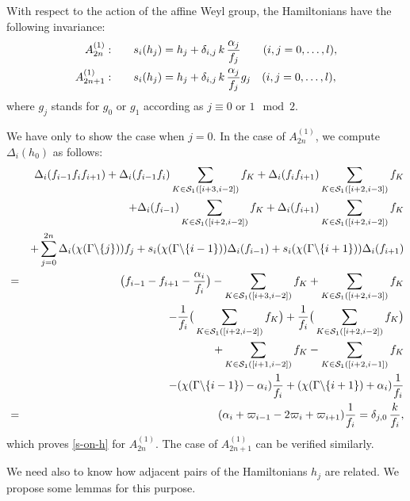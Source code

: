 \begin{prop} 
With respect to the action of the affine Weyl group, the Hamiltonians 
have the following invariance:
\begin{equation}\Label{s-on-h}
\begin{align} 
A^{(1)}_{2n}:&\qquad
s_{i}(h_j)=h_j +\delta_{i,j}\, k\,\frac{\alpha_j}{f_j}\qquad (i,j=0,\ldots,l),
\\
A^{(1)}_{2n+1}:&\qquad
s_{i}(h_j)=h_j +\delta_{i,j}\, k\,\frac{\alpha_j}{f_j}g_j\quad (i,j=0,\ldots,l),
\notag
\end{align}
\end{equation}
where $g_j$ stands for $g_0$ or $g_1$ according as $j\equiv 0$ or $1 \mod 2$. 
\end{prop}
\begin{pf}
We have only to show the case when $j=0$. 
In the case of $A^{(1)}_{2n}$,
we compute $\Delta_i(h_0)$ as follows: 
\allowdisplaybreaks
\begin{eqnarray*}
&& 
\Delta_i(f_{i-1}f_{i}f_{i+1})
+\Delta_i(f_{i-1}f_i)\sum_{K\in {\cal S}_1([i+3,i-2])} f_K
+\Delta_i(f_{i}f_{i+1})\sum_{K\in {\cal S}_1([i+2,i-3])} f_K
\\*
&&
+\Delta_i(f_{i-1})\sum_{K\in {\cal S}_1([i+2,i-2])} f_K
+\Delta_i(f_{i+1})\sum_{K\in {\cal S}_1([i+2,i-2])} f_K
\\*
&&
+\sum_{j=0}^{2n}\Delta_i(\chi(\Gamma\backslash\{j\}))f_j
+s_i(\chi(\Gamma\backslash\{i-1\}))\Delta_i(f_{i-1})
+s_i(\chi(\Gamma\backslash\{i+1\}))\Delta_i(f_{i+1})
\\
&=&
\big(f_{i-1}-f_{i+1}-\frac{\alpha_i}{f_i}\big)
-\sum_{K\in {\cal S}_1([i+3,i-2])} f_K
+\sum_{K\in {\cal S}_1([i+2,i-3])} f_K
\\*
&&
-\frac{1}{f_i}\big(\sum_{K\in {\cal S}_1([i+2,i-2])} f_K\big)
+\frac{1}{f_i}\big(\sum_{K\in {\cal S}_1([i+2,i-2])} f_K\big)
\\*
&&
+\sum_{K\in{\cal S}_1([i+1,i-2])} f_K 
-\sum_{K\in{\cal S}_1([i+2,i-1])} f_K 
\\*
&&
-(\chi(\Gamma\backslash\{i-1\})-\alpha_i)\frac{1}{f_i}
+(\chi(\Gamma\backslash\{i+1\})+\alpha_i)\frac{1}{f_i}
\\*
&=&(\alpha_i+\varpi_{i-1}-2\varpi_i+\varpi_{i+1}) \frac{1}{f_i}
=\delta_{j,0}\,\frac{k}{f_i},
\end{eqnarray*}
which proves \eqref{s-on-h} for $A^{(1)}_{2n}$. 
The case of $A^{(1)}_{2n+1}$ can be verified similarly.  
\end{pf} 

We need also to know how adjacent pairs of the Hamiltonians $h_j$ 
are related.  
We propose some lemmas for this purpose. 

